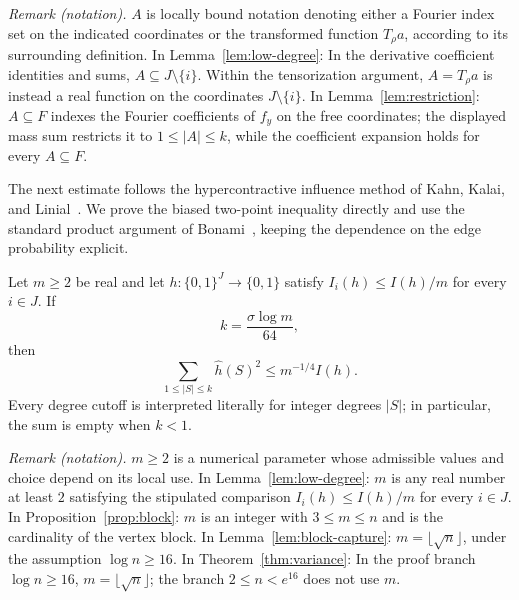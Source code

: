 \noindent\textit{Remark (notation).} $A$ is locally bound notation denoting either a Fourier index set on the indicated coordinates or the transformed function $T_\rho a$, according to its surrounding definition. In Lemma~\ref{lem:low-degree}: In the derivative coefficient identities and sums, $A\subseteq J\setminus\{i\}$. Within the tensorization argument, $A=T_\rho a$ is instead a real function on the coordinates $J\setminus\{i\}$. In Lemma~\ref{lem:restriction}: $A\subseteq F$ indexes the Fourier coefficients of $f_y$ on the free coordinates; the displayed mass sum restricts it to $1\le |A|\le k$, while the coefficient expansion holds for every $A\subseteq F$.


The next estimate follows the hypercontractive influence method of
Kahn, Kalai, and Linial~\cite{KKL88}. We prove the biased two-point
inequality directly and use the standard product argument of
Bonami~\cite[Chapter~III, Lemma~1]{Bonami1970}, keeping the dependence
on the edge probability explicit.

\begin{lemma}\label{lem:low-degree}
Let $m\ge2$ be real and let $h:\{0,1\}^J\to\{0,1\}$ satisfy
$I_i(h)\le I(h)/m$ for every $i\in J$. If
\[
  k=\frac{\sigma\log m}{64},
\]
then
\begin{equation}\label{eq:low-degree}
  \sum_{1\le |S|\le k}\widehat h(S)^2\le m^{-1/4}I(h).
\end{equation}
Every degree cutoff is interpreted literally for integer degrees $|S|$;
in particular, the sum is empty when $k<1$.
\end{lemma}

\noindent\textit{Remark (notation).} $m\ge2$ is a numerical parameter whose admissible values and choice depend on its local use. In Lemma~\ref{lem:low-degree}: $m$ is any real number at least $2$ satisfying the stipulated comparison $I_i(h)\le I(h)/m$ for every $i\in J$. In Proposition~\ref{prop:block}: $m$ is an integer with $3\le m\le n$ and is the cardinality of the vertex block. In Lemma~\ref{lem:block-capture}: $m=\lfloor\sqrt n\rfloor$, under the assumption $\log n\ge16$. In Theorem~\ref{thm:variance}: In the proof branch $\log n\ge16$, $m=\lfloor\sqrt n\rfloor$; the branch $2\le n<e^{16}$ does not use $m$.


